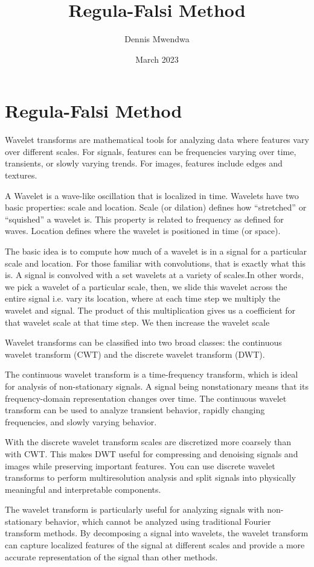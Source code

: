 \documentclass{article}
\title{Regula-Falsi Method}
\author{Dennis Mwendwa}
\date{March 2023}
\begin{document}
\maketitle
\section*{Regula-Falsi Method}
Wavelet transforms are mathematical tools for analyzing data where features vary over different scales. For signals, features can be frequencies varying over time, transients, or slowly varying trends. For images, features include edges and textures.

A Wavelet is a wave-like oscillation that is localized in time. 
Wavelets have two basic properties: scale and location. Scale (or dilation) defines how “stretched” or “squished” a wavelet is. This property is related to frequency as defined for waves. Location defines where the wavelet is positioned in time (or space).

The basic idea is to compute how much of a wavelet is in a signal for a particular scale and location. For those familiar with convolutions, that is exactly what this is. A signal is convolved with a set wavelets at a variety of scales.In other words, we pick a wavelet of a particular scale,  then, we slide this wavelet across the entire signal i.e. vary its location, where at each time step we multiply the wavelet and signal. The product of this multiplication gives us a coefficient for that wavelet scale at that time step. We then increase the wavelet scale 

Wavelet transforms can be classified into two broad classes: the continuous wavelet transform (CWT) and the discrete wavelet transform (DWT).

The continuous wavelet transform is a time-frequency transform, which is ideal for analysis of non-stationary signals. A signal being nonstationary means that its frequency-domain representation changes over time. The continuous wavelet transform can be used to analyze transient behavior, rapidly changing frequencies, and slowly varying behavior.

With the discrete wavelet transform scales are discretized more coarsely than with CWT. This makes DWT useful for compressing and denoising signals and images while preserving important features. You can use discrete wavelet transforms to perform multiresolution analysis and split signals into physically meaningful and interpretable components.

The wavelet transform is particularly useful for analyzing signals with non-stationary behavior, which cannot be analyzed using traditional Fourier transform methods. By decomposing a signal into wavelets, the wavelet transform can capture localized features of the signal at different scales and provide a more accurate representation of the signal than other methods.
\end{document}
